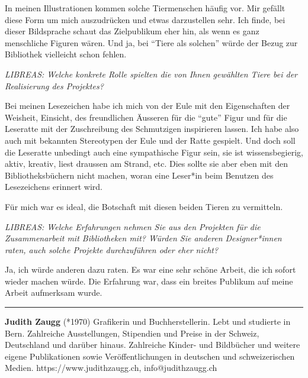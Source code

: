 \documentclass[a4paper,
fontsize=11pt,
oneside,
numbers=noperiodatend,
parskip=half-,
bibliography=totoc,
final
]{scrartcl}
\begin{document}
In meinen Illustrationen kommen solche Tiermenschen häufig vor. Mir
gefällt diese Form um mich auszudrücken und etwas darzustellen sehr. Ich
finde, bei dieser Bildsprache schaut das Zielpublikum eher hin, als wenn
es ganz menschliche Figuren wären. Und ja, bei \enquote{Tiere als
solchen} würde der Bezug zur Bibliothek vielleicht schon fehlen.

\emph{LIBREAS: Welche konkrete Rolle spielten die von Ihnen gewählten
Tiere bei der Realisierung des Projektes?}

Bei meinen Lesezeichen habe ich mich von der Eule mit den Eigenschaften
der Weisheit, Einsicht, des freundlichen Äusseren für die \enquote{gute}
Figur und für die Leseratte mit der Zuschreibung des Schmutzigen
inspirieren lassen. Ich habe also auch mit bekannten Stereotypen der
Eule und der Ratte gespielt. Und doch soll die Leseratte unbedingt auch
eine sympathische Figur sein, sie ist wissensbegierig, aktiv, kreativ,
liest draussen am Strand, etc. Dies sollte sie aber eben mit den
Bibliotheksbüchern nicht machen, woran eine Leser*in beim Benutzen des
Lesezeichens erinnert wird.

Für mich war es ideal, die Botschaft mit diesen beiden Tieren zu
vermitteln.

\emph{LIBREAS: Welche Erfahrungen nehmen Sie aus den Projekten für die
Zusammenarbeit mit Bibliotheken mit? Würden Sie anderen Designer*innen
raten, auch solche Projekte durchzuführen oder eher nicht?}

Ja, ich würde anderen dazu raten. Es war eine sehr schöne Arbeit, die
ich sofort wieder machen würde. Die Erfahrung war, dass ein breites
Publikum auf meine Arbeit aufmerksam wurde.

\begin{center}\rule{0.5\linewidth}{0.5pt}\end{center}

\textbf{Judith Zaugg} (*1970) Grafikerin
und Buchherstellerin. Lebt und studierte in Bern. Zahlreiche
Ausstellungen, Stipendien und Preise in der Schweiz, Deutschland und
darüber hinaus. Zahlreiche Kinder- und Bildbücher und weitere eigene
Publikationen sowie Veröffentlichungen in deutschen und schweizerischen
Medien. https://www.judithzaugg.ch, info@judithzaugg.ch
\end{document}
